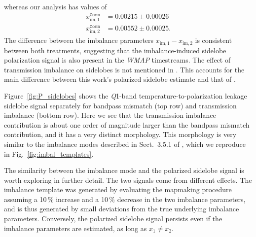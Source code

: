 \documentclass[twocolumn]{aa}
\begin{document}
whereas our analysis has values of 
\begin{align}
	x_\mathrm{im,1}^\mathtt{Comm}&=0.00215\pm0.00026
	\\
	x_\mathrm{im,2}^\mathtt{Comm}&=0.00552\pm0.00025.
\end{align}
The difference  between the imbalance parameters
${x_\mathrm{im,1}-x_\mathrm{im,2}}$ is consistent between  both treatments,
suggesting that the imbalance-induced sidelobe polarization signal is also
present in the \textit{WMAP} timestreams.  The effect of transmission imbalance
on sidelobes is not mentioned in \citet{barnes2003}. This accounts for the main
difference between this work's polarized sidelobe estimate and that of
\citet{barnes2003}.

Figure~\ref{fig:P_sidelobes} shows the \textit Q1-band
temperature-to-polarization leakage sidelobe signal separately for bandpass
mismatch (top row) and transmission imbalance (bottom row). Here we see that
the transmission imbalance contribution is about one order of magnitude larger
than the bandpass mismatch contribution, and it has a very distinct morphology.
This morphology is very similar to the imbalance modes described in
Sect.~3.5.1 of \citet{jarosik2007}, which we reproduce in
Fig.~\ref{fig:imbal_templates}.

The similarity between the imbalance mode and the polarized sidelobe signal is
worth exploring in further detail. The two signals come from different effects.
The imbalance template was generated by evaluating the mapmaking procedure
assuming a 10\,\% increase and a 10\,\% decrease in the two imbalance
parameters, and is thus generated by small deviations from the true underlying
imbalance parameters. Conversely, the polarized sidelobe signal persists even
if the imbalance parameters are estimated, as long as $x_1\neq x_2$.
\end{document}
